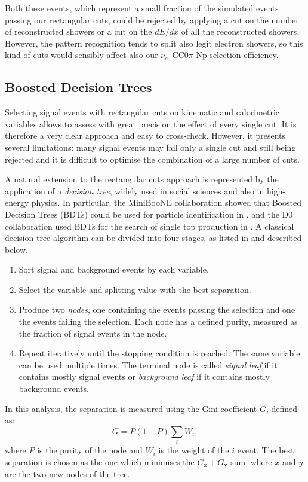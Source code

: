 Both these events, which represent a small fraction of the simulated events passing our rectangular cuts, could be rejected by applying a cut on the number of reconstructed showers or a cut on the $dE/dx$ of all the reconstructed showers. However, the pattern recognition tends to split also legit electron showers, so this kind of cuts would sensibly affect also our $\nu_e$~CC0$\pi$-Np selection efficiency.

\subsection{Boosted Decision Trees}\label{sec:bdt}
Selecting signal events with rectangular cuts on kinematic and calorimetric variables allows to assess with great precision the effect of every single cut. It is therefore a very clear approach and easy to cross-check. However, it presents several limitations: many signal events may fail only a single cut and still being rejected and it is difficult to optimise the combination of a large number of cuts. 

A natural extension to the rectangular cuts approach is represented by the application of a \emph{decision tree}, widely used in social sciences and also in high-energy physics. In particular, the MiniBooNE collaboration showed that Boosted Decision Trees (BDTs) could be used for particle identification in \cite{Yang:2005nz}, and the D0 collaboration used BDTs for the search of single top production in \cite{Abazov:2006gd}.
A classical decision tree algorithm can be divided into four stages, as listed in \cite{Coadou:2013lca} and described below.
\begin{enumerate}
    \item Sort signal and background events by each variable.
    \item Select the variable and splitting value with the best separation.
    \item Produce two \emph{nodes}, one containing the events passing the selection and one the events failing the selection. Each node has a defined purity, measured as the fraction of signal events in the node.
    \item Repeat iteratively until the stopping condition is reached. The same variable can be used multiple times. The terminal node is called \emph{signal leaf} if it contains mostly signal events or \emph{background leaf} if it contains mostly background events.
\end{enumerate}

In this analysis, the separation is measured using the Gini coefficient $G$, defined as:
\begin{equation}
    G = P(1-P)\sum_i W_i,
\end{equation}
where $P$ is the purity of the node and $W_i$ is the weight of the $i$ event. The best separation is chosen as the one which minimises the $G_{\mathrm{x}}+G_{\mathrm{y}}$ sum, where $x$ and $y$ are the two new nodes of the tree.

